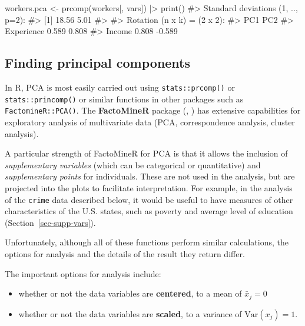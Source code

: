 \documentclass[
  letterpaper,
  10pt,
  krantz2]{krantz}
\makeatletter
\newenvironment{Shaded}{\begin{snugshade}}{\end{snugshade}}
\newcommand{\CommentTok}[1]{\textcolor[rgb]{0.37,0.37,0.37}{#1}}
\newcommand{\FunctionTok}[1]{\textcolor[rgb]{0.28,0.35,0.67}{#1}}
\newcommand{\NormalTok}[1]{\textcolor[rgb]{0.00,0.23,0.31}{#1}}
\newcommand{\OtherTok}[1]{\textcolor[rgb]{0.00,0.23,0.31}{#1}}
\newcommand{\SpecialCharTok}[1]{\textcolor[rgb]{0.37,0.37,0.37}{#1}}
\providecommand{\tightlist}{%
  \setlength{\itemsep}{0pt}\setlength{\parskip}{0pt}}\usepackage{longtable,booktabs,array}
\newenvironment{kframe}{%
  \medskip{}
  \setlength{\fboxsep}{.8em}
  \def\at@end@of@kframe{}%
  \ifinner\ifhmode%
  \def\at@end@of@kframe{\end{minipage}}%
  \begin{minipage}{\columnwidth}%
  \fi\fi%
  \def\FrameCommand##1{\hskip\@totalleftmargin \hskip-\fboxsep
  \colorbox{shadecolor}{##1}\hskip-\fboxsep
      \hskip-\linewidth \hskip-\@totalleftmargin \hskip\columnwidth}%
  \MakeFramed {\advance\hsize-\width
    \@totalleftmargin\z@ \linewidth\hsize
    \@setminipage}}%
{\par\unskip\endMakeFramed%
  \at@end@of@kframe}
\renewenvironment{Shaded}{\begin{kframe}}{\end{kframe}}
\makeatother
\begin{document}
\begin{Shaded}
\begin{Highlighting}[]
\NormalTok{workers.pca }\OtherTok{\textless{}{-}} \FunctionTok{prcomp}\NormalTok{(workers[, vars]) }\SpecialCharTok{|\textgreater{}} \FunctionTok{print}\NormalTok{()}
\CommentTok{\#\textgreater{} Standard deviations (1, .., p=2):}
\CommentTok{\#\textgreater{} [1] 18.56  5.01}
\CommentTok{\#\textgreater{} }
\CommentTok{\#\textgreater{} Rotation (n x k) = (2 x 2):}
\CommentTok{\#\textgreater{}              PC1    PC2}
\CommentTok{\#\textgreater{} Experience 0.589  0.808}
\CommentTok{\#\textgreater{} Income     0.808 {-}0.589}
\end{Highlighting}
\end{Shaded}

\subsection{Finding principal
components}\label{finding-principal-components}

In R, PCA is most easily carried out using \texttt{stats::prcomp()} or
\texttt{stats::princomp()} or similar functions in other packages such
as \texttt{FactomineR::PCA()}. The \textbf{FactoMineR} package
(,
) has extensive capabilities for
exploratory analysis of multivariate data (PCA, correspondence analysis,
cluster analysis).

A particular strength of FactoMineR for PCA is that it allows the
inclusion of \emph{supplementary variables} (which can be categorical or
quantitative) and \emph{supplementary points} for individuals. These are
not used in the analysis, but are projected into the plots to facilitate
interpretation. For example, in the analysis of the \texttt{crime} data
described below, it would be useful to have measures of other
characteristics of the U.S. states, such as poverty and average level of
education (Section~\ref{sec-supp-vars}).

Unfortunately, although all of these functions perform similar
calculations, the options for analysis and the details of the result
they return differ.

The important options for analysis include:

\begin{itemize}
\tightlist
\item
  whether or not the data variables are \textbf{centered}, to a mean of
  \(\bar{x}_j =0\)
\item
  whether or not the data variables are \textbf{scaled}, to a variance
  of \(\text{Var}(x_j) =1\).
\end{itemize}
\end{document}

